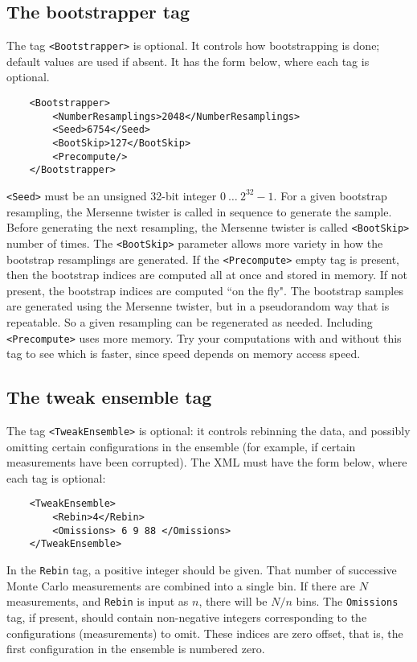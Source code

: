 \documentclass[12pt,notitlepage,letterpaper]{article}
\newcommand{\vb}{\texttt}
\begin{document}
\subsection{The bootstrapper tag}
The tag \vb{<Bootstrapper>} is optional.  It controls how bootstrapping
is done; default values are used if absent.  It has the form below, where each 
tag is optional.  
\begin{verbatim}
    <Bootstrapper>
        <NumberResamplings>2048</NumberResamplings>
        <Seed>6754</Seed>
        <BootSkip>127</BootSkip>
        <Precompute/>
    </Bootstrapper>
\end{verbatim}
\vb{<Seed>} must be an unsigned 32-bit integer $0\ \dots\ 2^{32}-1$.
For a given bootstrap resampling, the Mersenne twister is
called in sequence to generate the sample. Before generating
the next resampling, the Mersenne twister is called \vb{<BootSkip>}
number of times. The \vb{<BootSkip>} parameter allows more variety
in how the bootstrap resamplings are generated. If the \vb{<Precompute>} 
empty tag is present, then the bootstrap indices are computed all at once 
and stored in memory. If not present, the bootstrap indices are computed 
``on the fly". The bootstrap samples are generated using the Mersenne
twister, but in a pseudorandom way that is repeatable. So a given resampling 
can be regenerated as needed. Including \vb{<Precompute>} uses more memory.
Try your computations with and without this tag to see which is faster, 
since speed depends on memory access speed.

\subsection{The tweak ensemble tag}
The tag \vb{<TweakEnsemble>} is optional: it controls rebinning the data, 
and possibly omitting certain configurations in the ensemble (for example,
if certain measurements have been corrupted).  The XML must have the form 
below, where each tag is optional:
\begin{verbatim}
    <TweakEnsemble>
        <Rebin>4</Rebin>
        <Omissions> 6 9 88 </Omissions>
    </TweakEnsemble>
\end{verbatim}
In the \vb{Rebin} tag, a positive integer should be given.  That number of
successive Monte Carlo measurements are combined into a single bin.
If there are $N$ measurements, and \vb{Rebin} is input as $n$,
there will be $N/n$ bins. The \vb{Omissions} tag, if present,
should contain non-negative integers corresponding to the configurations
(measurements) to omit. These indices are zero offset, that is, the
first configuration in the ensemble is numbered zero.
\end{document}
